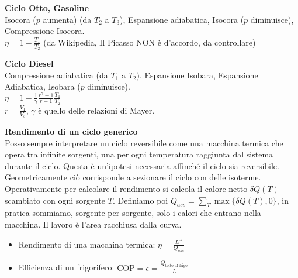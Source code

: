 \documentclass[10pt,a4paper]{article}
\newcommand{\Lusc}{{\ensuremath{L^{\vec{}}}}}
\begin{document}
\begin{multicols}{2}
\textbf{Ciclo Otto, Gasoline} \\
Isocora ($p$ aumenta) (da $T_2$ a $T_3$), Espansione adiabatica, Isocora ($p$ diminuisce), Compressione Isocora. \\
$\eta = 1- \frac{T_1}{T_2}$ (da Wikipedia, Il Picasso NON è d'accordo, da controllare)

\textbf{Ciclo Diesel} \\
Compressione adiabatica (da $T_1$ a $T_2$), Espansione Isobara, Espansione Adiabatica, Isobara ($p$ diminuisce). \\
$\eta= 1-\frac{1}{\gamma} \frac{r^\gamma -1}{r-1} \frac{T_1}{T_2}$ \\
$r=\frac{V_1}{V_3}$, $\gamma$ è quello delle relazioni di Mayer.


\textbf{Rendimento di un ciclo generico} \\
Posso sempre interpretare un ciclo reversibile come una macchina termica che opera tra infinite sorgenti, una per ogni temperatura raggiunta dal sistema durante il ciclo. Questa è un'ipotesi necessaria affinché il ciclo sia reversibile. 
Geometricamente ciò corrisponde a sezionare il ciclo con delle isoterme. 
Operativamente per calcolare il rendimento si calcola il calore netto $\delta Q(T)$ scambiato con ogni sorgente $T$. Definiamo poi $Q_{ass}=\sum_T \max\{ \delta Q(T), 0 \}$, in pratica sommiamo, sorgente per sorgente, solo i calori che entrano nella macchina.
Il lavoro è l'area racchiusa dalla curva.
  
  
  \begin{itemize}
  \item Rendimento di una macchina termica: $\eta = \frac{\Lusc}{Q_{ass}}$
  \item Efficienza di un frigorifero: $\mbox{COP}=\epsilon = \frac{Q_{\mbox{tolto al frigo}}}{L}$
  \end{itemize}


\end{multicols}
\end{document}

